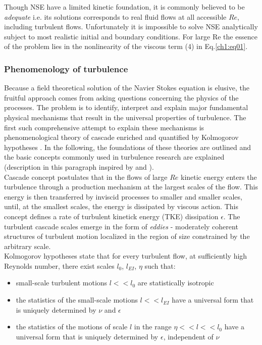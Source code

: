 \documentclass[../main.tex]{subfiles}
\begin{document}
\noindent Though NSE have a limited kinetic foundation, it is commonly believed to be \emph{adequate} i.e. its solutions corresponds to real fluid flows at all accessible $Re$, including turbulent flows. Unfortunately it is impossible to solve NSE analytically subject to most realistic initial and boundary conditions. For large Re the essence of the problem lies in the nonlinearity of the viscous term (4) in Eq.\ref{ch1:eq01}.

\subsubsection{Phenomenology of turbulence}

Because a field theoretical solution of the Navier Stokes equation is elusive, the fruitful approach comes from asking questions concerning the physics of the processes. The problem is to identify, interpret and explain major fundamental physical mechanisms that result in the universal properties of turbulence. The first such comprehensive attempt to explain these mechanisms is phenomenological theory of cascade \citep{Richardson1922} enriched and quantified by Kolmogorov hypotheses \citep{Kolmogorov1941}. In the following, the foundations of these theories are outlined and the basic concepts commonly used in turbulence research are explained (description in this paragraph inspired by \citet{Pope2011} and \citet{Tsinober2001}).\\
Cascade concept postulates that in the flows of large $Re$ kinetic energy enters the turbulence through a production mechanism at the largest scales of the flow. This energy is then transferred by inviscid processes to smaller and smaller scales, until, at the smallest scales, the energy is dissipated by viscous action.  This concept defines a rate of turbulent kinetick energy (TKE) dissipation $\epsilon$.  The turbulent cascade scales emerge in the form of \emph{eddies} - moderately coherent structures of turbulent motion localized in the region of size constrained by the arbitrary scale.\\
Kolmogorov hypotheses state that for every turbulent flow, at sufficiently high Reynolds number, there exist scales $l_0$, $l_{EI}$, $\eta$ such that:
\begin{itemize}
\item small-scale turbulent motions $l<<l_0$ are statistically isotropic
\item the statistics of the small-scale motions $l<<l_{EI}$ have a universal form that is uniquely determined by $\nu$ and $\epsilon$
\item the statistics of the motions of scale $l$ in the range $\eta<<l<<l_0$ have a universal form that is uniquely determined by $\epsilon$, independent of $\nu$ 
\end{itemize}
\end{document}
